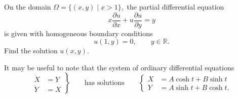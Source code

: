 On the domain
\(
\Omega = \{(x,y) \mid x>1\},
\)
the partial differential equation
\begin{equation}
x
\frac{\partial u}{\partial x}
+
u
\frac{\partial u}{\partial y}
=
y
\label{30000026:pde}
\end{equation}
is given with homogeneous boundary conditions
\[
u(1,y) = 0, \qquad y\in \mathbb{R}.
\]
Find the solution $u(x,y)$.

\begin{hinweis}
It may be useful to note that the system of ordinary differential
equations
\[
\left.
\begin{aligned}
\dot{X} &= Y\\
\dot{Y} &= X
\end{aligned}
\right\}
\qquad\text{has solutions}\qquad
\left\{
\begin{aligned}
X &= A\cosh t + B\sinh t\\
Y &= A\sinh t + B\cosh t.
\end{aligned}
\right.
\]
\end{hinweis}

